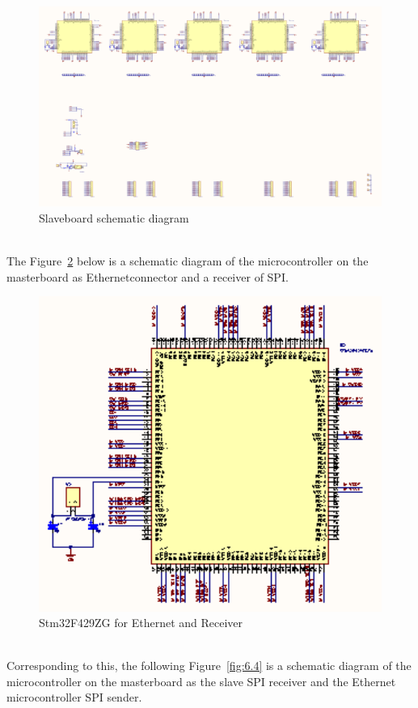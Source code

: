 \begin{figure}[!ht]
	\centering
	\includegraphics[width=16cm]{grafiken/6.2.pdf}
	\caption{Slaveboard schematic diagram} 
	\label{fig:6.2}
\end{figure}
\FloatBarrier
\\

The Figure~\ref{fig:6.3} below is a schematic diagram of the microcontroller on the masterboard as  Ethernetconnector and a receiver of SPI.

\begin{figure}[!ht]
	\centering
	\includegraphics[width=16cm]{grafiken/f429.eps}
	\caption{Stm32F429ZG for Ethernet and Receiver} 
	\label{fig:6.3}
\end{figure}
\FloatBarrier
\\
Corresponding to this, the following Figure~\ref{fig:6.4} is a schematic diagram of the microcontroller on the masterboard as the slave SPI receiver and the Ethernet microcontroller SPI sender.


